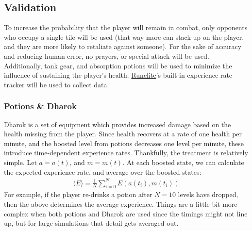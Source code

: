 \documentclass[../../main.tex]{subfiles}
\begin{document}
		\subsection{Validation}
			To increase the probability that the player will remain in combat, only opponents who occupy a single tile will be used (that way more can stack up on the player, and they are more likely to retaliate against someone). For the sake of accuracy and reducing human error, no prayers, or special attack will be used. Additionally, tank gear, and absorption potions will be used to minimize the influence of sustaining the player's health. \href{https://runelite.net/}{Runelite}'s built-in experience rate tracker will be used to collect data.

			\subsubsection{Potions \& Dharok}
				Dharok is a set of equipment which provides increased damage based on the health missing from the player. Since health recovers at a rate of one health per minute, and the boosted level from potions decreases one level per minute, these introduce time-dependent experience rates. Thankfully, the treatment is relatively simple. Let $a = a(t)$, and $m = m(t)$. At each boosted state, we can calculate the expected experience rate, and average over the boosted states:
				\begin{align}
					\boxed{\langle E \rangle = \frac{1}{N}\sum_{i=0}^{N} E(a(t_i), m(t_i))}
				\end{align}
				For example, if the player re-drinks a potion after $N=10$ levels have dropped, then the above determines the average experience. Things are a little bit more complex when both potions and Dharok are used since the timings might not line up, but for large simulations that detail gets averaged out.
\end{document}
